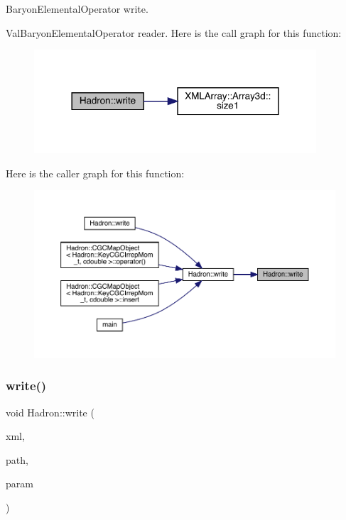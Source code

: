 Baryon\+Elemental\+Operator write. 

Val\+Baryon\+Elemental\+Operator reader. Here is the call graph for this function\+:
\nopagebreak
\begin{figure}[H]
\begin{center}
\leavevmode
\includegraphics[width=298pt]{d1/daf/namespaceHadron_a6ba238c6945bb5d95ae189cfee93a690_cgraph}
\end{center}
\end{figure}
Here is the caller graph for this function\+:
\nopagebreak
\begin{figure}[H]
\begin{center}
\leavevmode
\includegraphics[width=350pt]{d1/daf/namespaceHadron_a6ba238c6945bb5d95ae189cfee93a690_icgraph}
\end{center}
\end{figure}
\mbox{\label{namespaceHadron_a04a5b512d84ea116e0714765e22cbc30}} 
\subsubsection{\texorpdfstring{write()}{write()}\hspace{0.1cm}{\footnotesize\ttfamily [71/95]}}
{\footnotesize\ttfamily void Hadron\+::write (\begin{DoxyParamCaption}\item[{\mbox{\hyperlink{classADATXML_1_1XMLWriter}{X\+M\+L\+Writer}} \&}]{xml,  }\item[{const std\+::string \&}]{path,  }\item[{const \mbox{\hyperlink{structHadron_1_1KeyHadronSUNNPartIrrepOp__t}{Key\+Hadron\+S\+U\+N\+N\+Part\+Irrep\+Op\+\_\+t}} \&}]{param }\end{DoxyParamCaption})}



